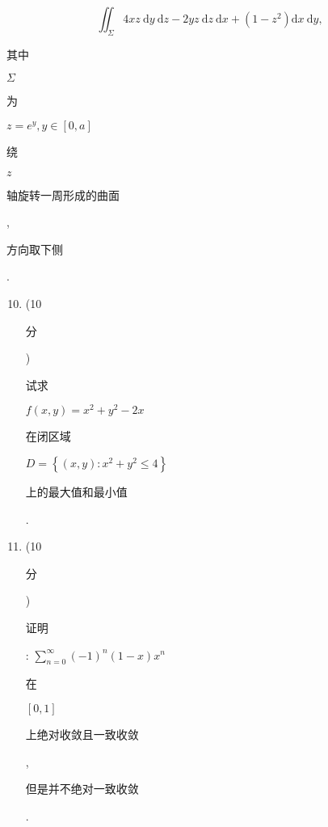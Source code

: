 \documentclass[10pt]{article}
\begin{document}
$$
\iint_{\Sigma} 4 x z \mathrm{~d} y \mathrm{~d} z-2 y z \mathrm{~d} z \mathrm{~d} x+\left(1-z^{2}\right) \mathrm{d} x \mathrm{~d} y,
$$
\begin{CJK}{UTF8}{mj}其中\end{CJK} $\Sigma$ \begin{CJK}{UTF8}{mj}为\end{CJK} $z=e^{y}, y \in[0, a]$ \begin{CJK}{UTF8}{mj}绕\end{CJK} $z$ \begin{CJK}{UTF8}{mj}轴旋转一周形成的曲面\end{CJK}, \begin{CJK}{UTF8}{mj}方向取下侧\end{CJK}.

\begin{enumerate}
  \setcounter{enumi}{9}
  \item (10 \begin{CJK}{UTF8}{mj}分\end{CJK}) \begin{CJK}{UTF8}{mj}试求\end{CJK} $f(x, y)=x^{2}+y^{2}-2 x$ \begin{CJK}{UTF8}{mj}在闭区域\end{CJK} $D=\left\{(x, y): x^{2}+y^{2} \leqslant 4\right\}$ \begin{CJK}{UTF8}{mj}上的最大值和最小值\end{CJK}.

  \item (10 \begin{CJK}{UTF8}{mj}分\end{CJK}) \begin{CJK}{UTF8}{mj}证明\end{CJK}: $\sum_{n=0}^{\infty}(-1)^{n}(1-x) x^{n}$ \begin{CJK}{UTF8}{mj}在\end{CJK} $[0,1]$ \begin{CJK}{UTF8}{mj}上绝对收敛且一致收敛\end{CJK}, \begin{CJK}{UTF8}{mj}但是并不绝对一致收敛\end{CJK}.

\end{enumerate}
\end{document}
